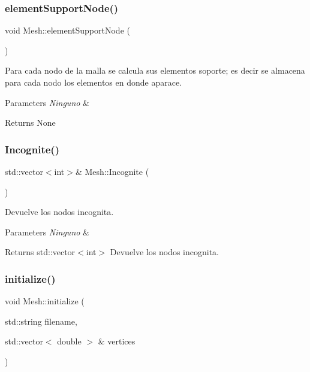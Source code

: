 \subsubsection{\texorpdfstring{element\+Support\+Node()}{elementSupportNode()}}
{\footnotesize\ttfamily void Mesh\+::element\+Support\+Node (\begin{DoxyParamCaption}{ }\end{DoxyParamCaption})}



Para cada nodo de la malla se calcula sus elementos soporte; es decir se almacena para cada nodo los elementos en donde aparace. 


\begin{DoxyParams}{Parameters}
{\em Ninguno} & \\
\hline
\end{DoxyParams}
\begin{DoxyReturn}{Returns}
None 
\end{DoxyReturn}
\hypertarget{class_mesh_add85351d5f09484fa3b4dd43d1043ae9}{}\label{class_mesh_add85351d5f09484fa3b4dd43d1043ae9} 
\subsubsection{\texorpdfstring{Incognite()}{Incognite()}}
{\footnotesize\ttfamily std\+::vector$<$int$>$\& Mesh\+::\+Incognite (\begin{DoxyParamCaption}{ }\end{DoxyParamCaption})\hspace{0.3cm}{\ttfamily [inline]}}



Devuelve los nodos incognita. 


\begin{DoxyParams}{Parameters}
{\em Ninguno} & \\
\hline
\end{DoxyParams}
\begin{DoxyReturn}{Returns}
std\+::vector$<$int$>$ Devuelve los nodos incognita. 
\end{DoxyReturn}
\hypertarget{class_mesh_afa6559daf1f8495fd0a796fb31370542}{}\label{class_mesh_afa6559daf1f8495fd0a796fb31370542} 
\subsubsection{\texorpdfstring{initialize()}{initialize()}}
{\footnotesize\ttfamily void Mesh\+::initialize (\begin{DoxyParamCaption}\item[{std\+::string}]{filename,  }\item[{std\+::vector$<$ double $>$ \&}]{vertices }\end{DoxyParamCaption})}


